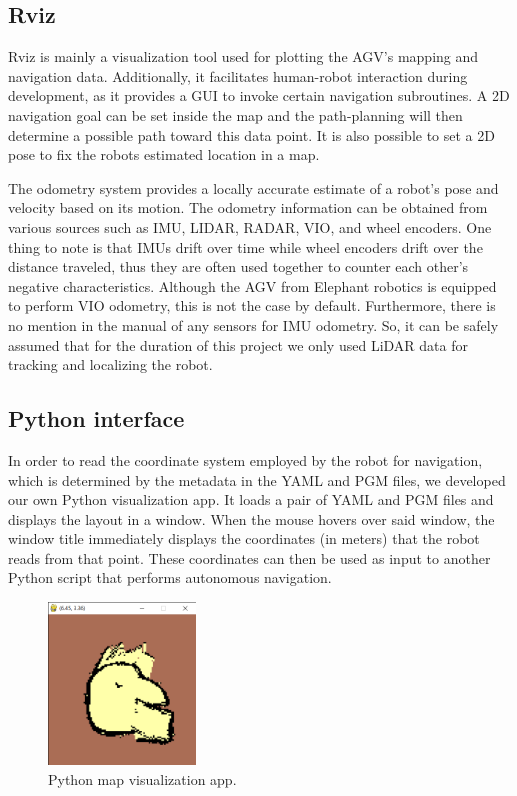\subsection{Rviz}
Rviz is mainly a visualization tool used for plotting the AGV's mapping and navigation data. Additionally, it facilitates human-robot interaction during development, as it provides a GUI to invoke certain navigation subroutines. A 2D navigation goal can be set inside the map and the path-planning will then determine a possible path toward this data point. It is also possible to set a 2D pose  to fix the robots estimated location in a map. 

The odometry system provides a locally accurate estimate of a robot’s pose and velocity based on its motion. The odometry information can be obtained from various sources such as IMU, LIDAR, RADAR, VIO, and wheel encoders. One thing to note is that IMUs drift over time while wheel encoders drift over the distance traveled, thus they are often used together to counter each other’s negative characteristics. Although the AGV from Elephant robotics is equipped to perform VIO odometry, this is not the case by default. Furthermore, there is no mention in the manual of any sensors for IMU odometry. So, it can be safely assumed that for the duration of this project we only used LiDAR data for tracking and localizing the robot.


\subsection{Python interface}
In order to read the coordinate system employed by the robot for navigation, which is determined by the metadata in the YAML and PGM files, we developed our own Python visualization app. It loads a pair of YAML and PGM files and displays the layout in a window. When the mouse hovers over said window, the window title immediately displays the coordinates (in meters) that the robot reads from that point. These coordinates can then be used as input to another Python script that performs autonomous navigation.

\begin{figure}[H]
     \centering
     \includegraphics[width=0.35\textwidth,height=0.45\textheight,keepaspectratio]{images/visappdemo.png}
     \caption{Python map visualization app.}
     \label{fig:app:map2}
\end{figure}
